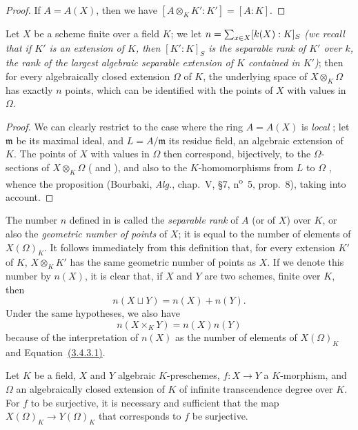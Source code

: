\begin{proof}
If $A=A(X)$, then we have $[A\otimes_K K':K']=[A:K]$.
\end{proof}

\begin{corollary}[6.4.7]
\label{I.6.4.7}
Let $X$ be a scheme finite over a field $K$;
we let $n=\sum_{x\in X}[k(X):K]_S$ \emph{(we recall that if $K'$ is an extension of $K$, then $[K':K]_S$ is the \emph{separable rank} of $K'$ over $k$, the rank of the largest algebraic separable extension of $K$ contained in $K'$)};
then
for every algebraically closed extension $\Omega$ of $K$, the underlying space of $X\otimes_K\Omega$ has exactly $n$ points, which can be identified with the points of $X$ with values in $\Omega$.
\end{corollary}

\begin{proof}
We can clearly restrict to the case where the ring $A=A(X)$ is \emph{local} ;
let $\mathfrak{m}$ be its maximal ideal, and $L=A/\mathfrak{m}$ its residue field, an algebraic extension of $K$.
The points of $X$ with values in $\Omega$ then correspond, bijectively, to the $\Omega$-sections of $X\otimes_K\Omega$ ( and ), and also to the $K$-homomorphisms from $L$ to $\Omega$ , whence the proposition (Bourbaki, \emph{Alg.}, chap.~V, §7, n\textsuperscript{o}~5, prop.~8), taking  into account.
\end{proof}

\begin{env}[6.4.8]
\label{I.6.4.8}
The number $n$ defined in  is called the \emph{separable rank} of $A$ (or of $X$) over $K$, or also the \emph{geometric number of points} of $X$;
it is equal to the number of elements of $X(\Omega)_K$.
It follows immediately from this definition that, for every extension $K'$ of $K$, $X\otimes_K K'$ has the same geometric number of points as $X$.
If we denote this number by $n(X)$, it is clear that, if $X$ and $Y$ are two schemes, finite over $K$, then
\[
  n(X\sqcup Y)=n(X)+n(Y).
  \tag{6.4.8.1}
\]
Under the same hypotheses, we also have
\[
  n(X\times_K Y)=n(X)n(Y)
  \tag{6.4.8.2}
\]
because of the interpretation of $n(X)$ as the number of elements of $X(\Omega)_K$ and Equation~\hyperref[1.3.4.3]{(3.4.3.1)}.
\end{env}

\begin{proposition}[6.4.9]
\label{I.6.4.9}
Let $K$ be a field, $X$ and $Y$ algebraic $K$-preschemes, $f:X\to Y$ a $K$-morphism, and $\Omega$ an algebraically closed extension of $K$ of infinite transcendence degree over $K$.
For $f$ to be surjective, it is necessary and sufficient that the map $X(\Omega)_K\to Y(\Omega)_K$ that corresponds to $f$  be surjective.
\end{proposition}

